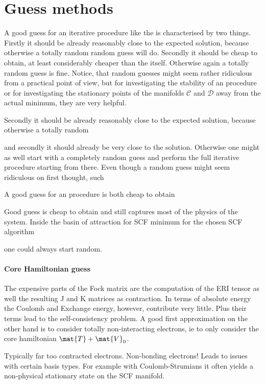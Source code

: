 \section{Guess methods}
A good guess for an iterative procedure like the \SCF
is characterised by two things.
Firstly it should be already reasonably close to the expected solution,
because otherwise a totally random random guess will do.
Secondly it should be cheap to obtain,
at least considerably cheaper than the \SCF itself.
Otherwise again a totally random guess is fine.
Notice, that random guesses might seem rather ridiculous from a practical point of view,
but for investigating the stability of an \SCF procedure
or for investigating the stationary points of the manifolds $\mathcal{C}$
and $\mathcal{D}$ away from the actual minimum,
they are very helpful.



Secondly it should be already reasonably close to the expected solution,
because otherwise a totally random 

and secondly
it should already be very close to the solution.
Otherwise one might as well start with a completely random
guess and perform the full iterative procedure starting from there.
Even though a random guess might seem ridiculous on first thought,
such 



A good guess for an \SCF procedure is both cheap to obtain


Good guess is cheap to obtain and still captures most of the physics of the system.
Inside the basin of attraction for SCF minimum
for the chosen SCF algorithm

one could always start random.

\paragraph{Core Hamiltonian guess}
The expensive parts of the Fock matrix are the computation
of the ERI tensor as well the resulting J and K matrices as contraction.
In terms of absolute energy the Coulomb and Exchange energy,
however, contribute very little.
Plus their terms lead to the self-consistency problem.
A good first approximation on the other hand is to consider
totally non-interacting electrons, ie to only consider the core hamiltonian
$\mat{T} + \mat{V}_0$.

Typically far too contracted electrons.
Non-bonding electrons!
Leads to issues with certain basis types.
For example with Coulomb-Strumians it often yields a non-physical
stationary state on the SCF manifold.

